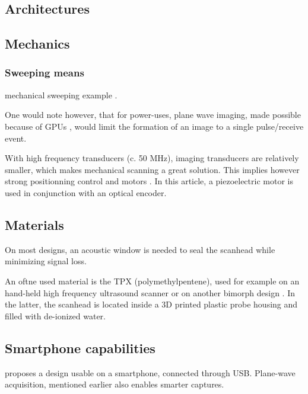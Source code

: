 \documentclass[conference]{IEEEtran}
\begin{document}
\subsection{Architectures}




\subsection{Mechanics}


\subsubsection{Sweeping means}


mechanical sweeping example \cite{svilainis_electronics_2014}.


One would note however, that for power-uses, plane wave imaging, made possible because of GPUs \cite{hewener_mobile_2015}, would limit the formation of an image to a single pulse/receive event.


With high frequency transducers (c. 50 MHz), imaging transducers are relatively smaller, which makes mechanical scanning a great solution. This implies however strong positionning control and motors \cite{carotenuto_very_2004}. In this article, a piezoelectric	 motor is used in conjunction with an optical encoder. 

\subsection{Materials}


On most designs, an acoustic window is needed to seal the scanhead while minimizing signal loss.

An oftne used material is the TPX (polymethylpentene), used for example on an hand-held high frequency ultrasound scanner  \cite{erickson_hand-held_2001} or on another bimorph design \cite{brown_low_2013}. In the latter, the scanhead is located inside a 3D printed plastic probe housing and filled with de-ionized water.

\subsection{Smartphone capabilities}

\cite{kim_smart-phone_2017} proposes a design usable on a smartphone, connected through USB. Plane-wave acquisition, mentioned earlier \cite{hewener_mobile_2015} also enables smarter captures.
\end{document}

